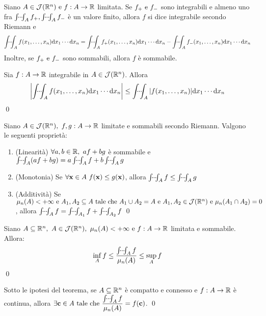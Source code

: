 \begin{definition}
    Siano $A \in \mathcal{J}(\mathbb{R}^n) \text{ e } f: A \to \mathbb{R}$ limitata. Se $f_+ \text{ e } f_-$ sono integrabili e almeno uno fra $\idotsint_A f_+, \idotsint_A f_-$ è un valore finito, allora $f$ si dice integrabile secondo Riemann e
    $$
        \idotsint_Af(x_1,\dots,x_n)\dd x_1\cdots \dd x_n = \idotsint_A f_+(x_1,\dots,x_n)\dd x_1\cdots \dd x_n - \idotsint_A f_-(x_1,\dots,x_n)\dd x_1\cdots \dd x_n
    $$
    Inoltre, se $f_+ \text{ e } f_-$ sono sommabili, allora $f$ è sommabile.
\end{definition}

\begin{theorem}
    Sia $f: A \to \mathbb{R}$ integrabile in $A \in \mathcal{J}(\mathbb{R}^n)$. Allora
    $$
        \abs{\idotsint_A f(x_1,\dots,x_n)\dd x_1\cdots \dd x_n} \leq \idotsint_A\abs{f(x_1,\dots,x_n)}\dd x_1\cdots \dd x_n
    $$
    \qed
\end{theorem}

\begin{theorem}
    Siano $A \in \mathcal{J}(\mathbb{R}^n), \ f,g: A \to \mathbb{R}$ limitate e sommabili secondo Riemann. Valgono le seguenti proprietà:
    \begin{enumerate}
        \item (Linearità) $\forall a,b \in \mathbb{R}, \ af + bg$ è sommabile e $\idotsint_A(af+bg)=a\idotsint_A f+b\idotsint_A g$
        \item (Monotonia) Se $\forall \vb{x} \in A \ f(\vb{x}) \leq g(\vb{x})$, allora $\idotsint_A f \leq \idotsint_A g$
        \item (Additività) Se $\mu_n(A) < + \infty \text{ e } A_1,A_2 \subseteq A \text{ tale che } A_1 \cup A_2 = A \text{ e } A_1,A_2 \in \mathcal{J}(\mathbb{R}^n) \text{ e } \mu_n(A_1 \cap A_2)=0$, allora $\idotsint_A f= \idotsint_{A_1} f+ \idotsint_{A_2} f$
        \qed
    \end{enumerate}
\end{theorem}

\begin{theorem}
    Siano $A \subseteq \mathbb{R}^n, \ A \in \mathcal{J}(\mathbb{R}^n), \ \mu_n(A) < +\infty \text{ e } f: A \to \mathbb{R}$ limitata e sommabile. Allora:
    $$
        \inf_A f \leq \frac{\idotsint_A f}{\mu_n(A)}\leq \sup_A f
    $$
    \qed
\end{theorem}

\begin{corollary}
    Sotto le ipotesi del teorema, se $A \subseteq \mathbb{R}^n$ è compatto e connesso e $f: A \to \mathbb{R}$ è continua, allora $\exists \vb{c} \in A \text{ tale che } \displaystyle\frac{\idotsint_A f}{\mu_n(A)}=f(\vb{c})$.
    \qed
\end{corollary}

